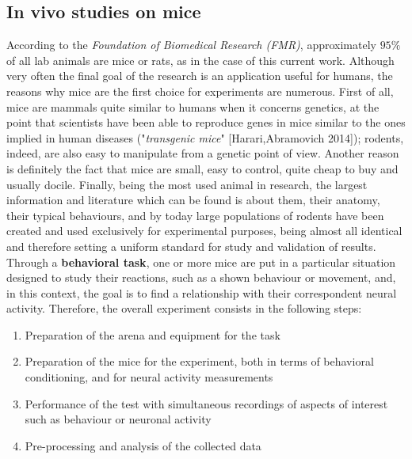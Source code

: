 \documentclass[12pt, a4paper]{article}
\begin{document}
\newpage

\subsection{In vivo studies on mice}

According to the \textit{Foundation of Biomedical Research (FMR)}, approximately $95\% $ of all lab animals are mice or rats, as in the case of this current work. Although very often the final goal of the research is an application useful for humans, the reasons why mice are the first choice for experiments are numerous. First of all, mice are mammals quite similar to humans when it concerns genetics, at the point that scientists have been able to reproduce genes in mice similar to the ones implied in human diseases ("\textit{transgenic mice}" [Harari,Abramovich 2014]); rodents, indeed, are also easy to manipulate from a genetic point of view. Another reason is definitely the fact that mice are small, easy to control, quite cheap to buy and usually docile. Finally, being the most used animal in research, the largest information and literature which can be found is about them, their anatomy, their typical behaviours, and by today large populations of rodents have been created and used exclusively for experimental purposes, being almost all identical and therefore setting a uniform standard for study and validation of results. \\
Through a  \textbf{behavioral task}, one or more mice are put in a particular situation designed to study their reactions, such as a shown behaviour or movement, and, in this context, the goal is to find a relationship with their correspondent neural activity. Therefore, the overall experiment consists in the following steps:
\begin{enumerate}
	\item Preparation of the arena and equipment for the task 
	\item Preparation of the mice for the experiment, both in terms of behavioral conditioning, and for neural activity measurements
	\item Performance of the test with simultaneous recordings of  aspects of interest such as behaviour or neuronal activity
	\item Pre-processing and analysis of the collected data
\end{enumerate}
\end{document}
